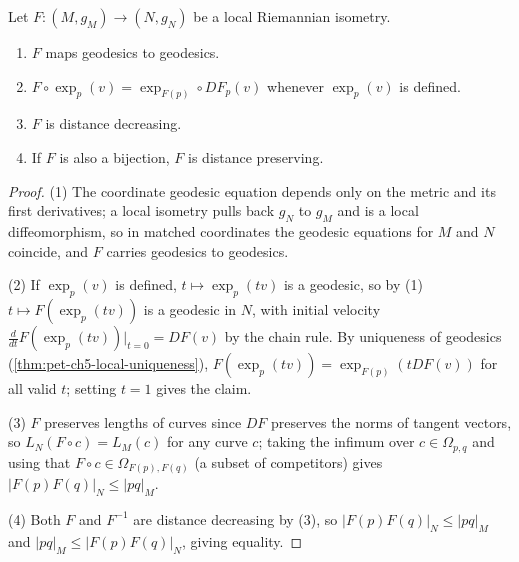 \begin{proposition}
  \label{prop:pet-ch5-local-isometry-properties}
  Let $F:(M,g_M)\to(N,g_N)$ be a local Riemannian isometry.
  \begin{enumerate}
  \item[(1)] $F$ maps geodesics to geodesics.
  \item[(2)] $F\circ\exp_p(v)=\exp_{F(p)}\circ DF_p(v)$ whenever $\exp_p(v)$ is
  defined.
  \item[(3)] $F$ is distance decreasing.
  \item[(4)] If $F$ is also a bijection, $F$ is distance preserving.
  \end{enumerate}
\end{proposition}
\begin{proof}
  (1) The coordinate geodesic equation depends only on the metric and its first
  derivatives; a local isometry pulls back $g_N$ to $g_M$ and is a local
  diffeomorphism, so in matched coordinates the geodesic equations for $M$ and $N$
  coincide, and $F$ carries geodesics to geodesics.

  (2) If $\exp_p(v)$ is defined, $t\mapsto\exp_p(tv)$ is a geodesic, so by (1)
  $t\mapsto F(\exp_p(tv))$ is a geodesic in $N$, with initial velocity
  $\frac{d}{dt}F(\exp_p(tv))|_{t=0}=DF(v)$ by the chain rule. By uniqueness of
  geodesics (\cref{thm:pet-ch5-local-uniqueness}), $F(\exp_p(tv))=\exp_{F(p)}(tDF(v))$
  for all valid $t$; setting $t=1$ gives the claim.

  (3) $F$ preserves lengths of curves since $DF$ preserves the norms of tangent
  vectors, so $L_N(F\circ c)=L_M(c)$ for any curve $c$; taking the infimum over
  $c\in\Omega_{p,q}$ and using that $F\circ c\in\Omega_{F(p),F(q)}$ (a subset of
  competitors) gives $|F(p)F(q)|_N\le|pq|_M$.

  (4) Both $F$ and $F^{-1}$ are distance decreasing by (3), so
  $|F(p)F(q)|_N\le|pq|_M$ and $|pq|_M\le|F(p)F(q)|_N$, giving equality.
\end{proof}


